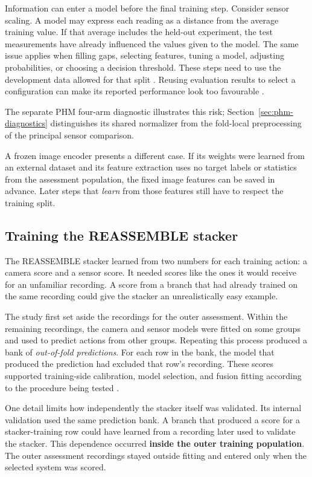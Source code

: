 Information can enter a model before the final training step. Consider sensor scaling. A
model may express each reading as a distance from the average training value. If that
average includes the held-out experiment, the test measurements have already influenced
the values given to the model. The same issue applies when filling gaps, selecting
features, tuning a model, adjusting probabilities, or choosing a decision threshold.
These steps need to use the development data allowed for that split \parencite{P017}.
Reusing evaluation results to select a configuration can make its reported performance
look too favourable \parencite{P004}.

The separate PHM four-arm diagnostic illustrates this risk;
Section~\ref{sec:phm-diagnostics} distinguishes its shared normalizer from the
fold-local preprocessing of the principal sensor comparison.

A frozen image encoder presents a different case. If its weights were learned from an
external dataset and its feature extraction uses no target labels or statistics from the
assessment population, the fixed image features can be saved in advance. Later steps
that \emph{learn} from those features still have to respect the training split.

\subsection{Training the REASSEMBLE stacker}

The REASSEMBLE stacker learned from two numbers for each training action: a camera score
and a sensor score. It needed scores like the ones it would receive for an unfamiliar
recording. A score from a branch that had already trained on the same recording could
give the stacker an unrealistically easy example.

The study first set aside the recordings for the outer assessment. Within the remaining
recordings, the camera and sensor models were fitted on some groups and used to predict
actions from other groups. Repeating this process produced a bank of \emph{out-of-fold
predictions}. For each row in the bank, the model that produced the prediction had
excluded that row’s recording. These scores supported training-side calibration, model
selection, and fusion fitting according to the procedure being tested
\parencite{Ting1999Issues}.

One detail limits how independently the stacker itself was validated. Its internal
validation used the same prediction bank. A branch that produced a score for a
stacker-training row could have learned from a recording later used to validate the
stacker. This dependence occurred \textbf{inside the outer training population}. The
outer assessment recordings stayed outside fitting and entered only when the selected
system was scored.

